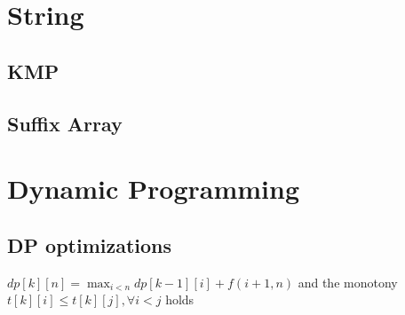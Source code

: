 \documentclass[a4paper,10pt,twocolumn,oneside]{article}
\begin{document}
\section{String}
\subsection{KMP}

\subsection{Suffix Array}

\section{Dynamic Programming}
\subsection{DP optimizations}
\large
$dp[k][n]=\max_{i<n}{dp[k-1][i]+f(i+1,n)}$ and the monotony $t[k][i]\leq t[k][j],\forall i<j$ holds
\end{document}
